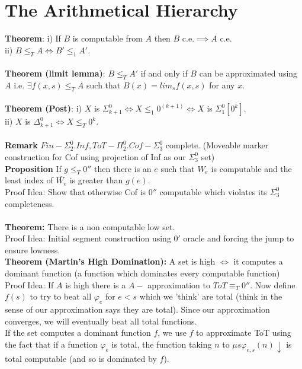 \documentclass{article}
\begin{document}
   \section{The Arithmetical Hierarchy} 
   \textbf{Theorem}: i) If $B$ is computable from $A$ then $B$ c.e.$\implies A$ c.e.\\ii) $B\leq_T A \iff B' \leq_1 A'$.\\
   \\
   \textbf{Theorem (limit lemma)}: $B \leq_T A'$ if and only if $B$ can be approximated using $A$ i.e. $\exists f(x,s) \leq_T A$ such that $B(x) = lim_s f(x,s)$ for any $x$.\\
   \\
   \textbf{Theorem (Post)}: i) $X$ is $\Sigma^0_{k+1} \iff X \leq_1 0^{(k+1)} \iff X$  is $\Sigma^0_1[0^k]$.\\ ii) $X$ is $\Delta_{k+1}^0 \iff X \leq_T 0^k$.\\
   \\
   \textbf{Remark} $Fin - \Sigma^0_2. Inf, ToT- \Pi^0_2. Cof - \Sigma^0_3$ complete. (Moveable marker construction for Cof using projection of Inf as our $\Sigma^0_3$ set)\\
   \textbf{Proposition} If $g \leq_T 0''$ then there is an $e$ such that $W_e$ is computable and the least index of $\overline{W_e}$ is greater than $g(e)$.\\
   Proof Idea: Show that otherwise Cof is $0''$ computable which violates its $\Sigma_3^0$ completeness.\\
   \\
   \textbf{Theorem:} There is a non computable low set.\\
   Proof Idea: Initial segment construction using $0'$ oracle and forcing the jump to ensure lowness.\\
   \textbf{Theorem (Martin's High Domination):} A set is high $\iff$ it computes a dominant function (a function which dominates every computable function)\\
   Proof Idea: If $A$ is high there is a $A-$ approximation to $ToT \equiv_T 0''$.
   Now define $f(s)$ to try to beat all $\varphi_e$ for $e<s$ which we 'think' are total (think in the sense of our approximation says they are total). Since our approximation converges, we will eventually beat all total functions.\\
   If the set computes a dominant function $f$, we use $f$ to approximate ToT using the fact that if a function $\varphi_e$ is total, the function taking $n$ to $\mu s \varphi_{e,s}(n)\downarrow$ is total computable (and so is dominated by $f$).
   \newpage
\end{document}
